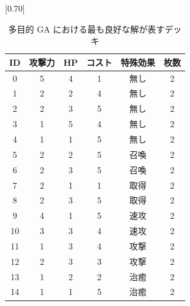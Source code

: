 \documentclass[12pt]{jarticle}
\begin{document}
  \begin{table}[ht]
    \centering
    \caption{多目的 GA における最も良好な解が表すデッキ}
    \label{table:multigadeck}
    \vspace{-0.3cm}
    \scalebox{0.70}[0.70]{
      \begin{tabular}{|c|c|c|c|c|c|}
        \hline
        ID & 攻撃力 & HP & コスト & 特殊効果 & 枚数 \\ \hline \hline
        0 & 5 & 4 & 1 & 無し & 2 \\ \hline
        1 & 2 & 2 & 4 & 無し & 2 \\ \hline
        2 & 2 & 3 & 5 & 無し & 2 \\ \hline
        3 & 1 & 5 & 4 & 無し & 2 \\ \hline
        4 & 1 & 1 & 5 & 無し & 2 \\ \hline
        5 & 2 & 2 & 5 & 召喚 & 2 \\ \hline
        6 & 2 & 3 & 5 & 召喚 & 2 \\ \hline
        7 & 2 & 1 & 1 & 取得 & 2 \\ \hline
        8 & 2 & 3 & 5 & 取得 & 2 \\ \hline
        9 & 4 & 1 & 5 & 速攻 & 2 \\ \hline
        10 & 3 & 3 & 4 & 速攻 & 2 \\ \hline
        11 & 1 & 3 & 4 & 攻撃 & 2 \\ \hline
        12 & 2 & 3 & 3 & 攻撃 & 2 \\ \hline
        13 & 1 & 2 & 2 & 治癒 & 2 \\ \hline
        14 & 1 & 1 & 5 & 治癒 & 2 \\ \hline
        \end{tabular}
    }
    \end{table}
  
\end{document}
